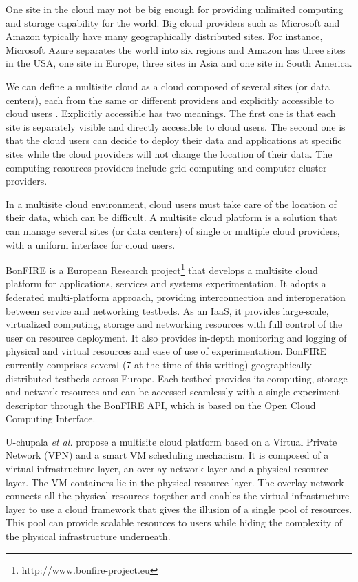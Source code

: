 One site in the cloud may not be big enough for providing unlimited computing and
storage capability for the world. Big cloud providers such as Microsoft and Amazon
typically have many geographically distributed sites.
For instance, Microsoft Azure separates
the world into six regions and Amazon has three sites in the USA, one site in Europe, three sites in Asia and
one site in South America.

We can define a multisite cloud as a cloud composed of
several sites (or data centers), each from the same or different
providers and explicitly accessible to cloud users \cite{Nguyen2012}.
Explicitly accessible has two meanings. The first one is that each
site is separately visible and directly accessible to cloud users.
The second one is that the cloud users can decide to deploy their
data and applications at specific sites while the cloud providers
will not change the location of their data. 
The computing resources providers include grid computing and computer cluster providers.

In a multisite cloud environment, cloud users must take care of
the location of their data, which can be difficult.
A multisite cloud platform is a solution that can manage several sites (or data centers)
of single or multiple cloud providers, with a uniform interface
for cloud users.

BonFIRE \cite{Hume2012} is a European Research project\footnote{http://www.bonfire-project.eu}
 that develops a
multisite cloud platform for applications, services and systems
experimentation.
It adopts a federated multi-platform approach,
providing interconnection and interoperation between service and
networking testbeds.
As an IaaS, it provides
large-scale, virtualized computing, storage and networking resources
with full control of the user on resource deployment.
It also provides in-depth monitoring and logging of physical and virtual resources
and ease of use of experimentation.
BonFIRE currently comprises several (7 at the time of this writing)
geographically distributed testbeds
across Europe. Each testbed provides its computing, storage and
network resources and can be accessed
seamlessly with a single experiment descriptor through the BonFIRE API, which is based on the Open Cloud Computing Interface.

U-chupala \textit{et al.} \cite{U-chupala2013} propose a multisite
cloud platform based on a Virtual Private Network
(VPN) and a smart VM scheduling mechanism. It
is composed of a virtual infrastructure layer, an overlay
network layer and a physical resource layer. The VM containers
lie in the physical resource layer. The overlay network
connects all the physical resources together and enables the virtual
infrastructure layer to use a cloud framework that gives the illusion
of a single pool of resources. This pool can provide scalable
resources to users while hiding the complexity of the physical infrastructure
underneath. 

